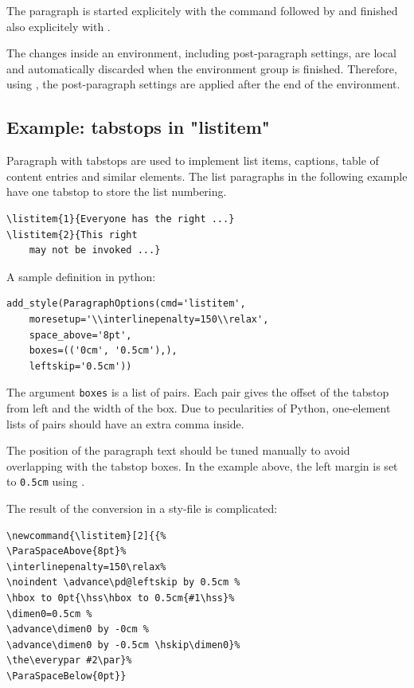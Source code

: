 \documentclass[]{ltugboat}
\begin{document}
The paragraph is started explicitely with the command  followed by  and finished also explicitely with .

The changes inside an environment, including post-paragraph settings, are local and automatically discarded when the environment group is finished. Therefore, using , the post-paragraph settings are applied after the end of the environment.

\subsection{Example: tabstops in "listitem"}

Paragraph with tabstops are used to implement list items, captions, table of content entries and similar elements. The list paragraphs in the following example have one tabstop to store the list numbering.

\begin{verbatim}
\listitem{1}{Everyone has the right ...}
\listitem{2}{This right
    may not be invoked ...}
\end{verbatim}

A sample definition in python:

\begin{verbatim}
add_style(ParagraphOptions(cmd='listitem',
    moresetup='\\interlinepenalty=150\\relax',
    space_above='8pt',
    boxes=(('0cm', '0.5cm'),),
    leftskip='0.5cm'))
\end{verbatim}

The argument \verb|boxes| is a list of pairs. Each pair gives the offset of the tabstop from left and the width of the box. Due to pecularities of Python, one-element lists of pairs should have an extra comma inside.

The position of the paragraph text should be tuned manually to avoid overlapping with the tabstop boxes. In the example above, the left margin is set to \verb|0.5cm| using .

The result of the conversion in a sty-file is complicated:

\begin{verbatim}
\newcommand{\listitem}[2]{{%
\ParaSpaceAbove{8pt}%
\interlinepenalty=150\relax%
\noindent \advance\pd@leftskip by 0.5cm %
\hbox to 0pt{\hss\hbox to 0.5cm{#1\hss}%
\dimen0=0.5cm %
\advance\dimen0 by -0cm %
\advance\dimen0 by -0.5cm \hskip\dimen0}%
\the\everypar #2\par}%
\ParaSpaceBelow{0pt}}
\end{verbatim}
\end{document}
